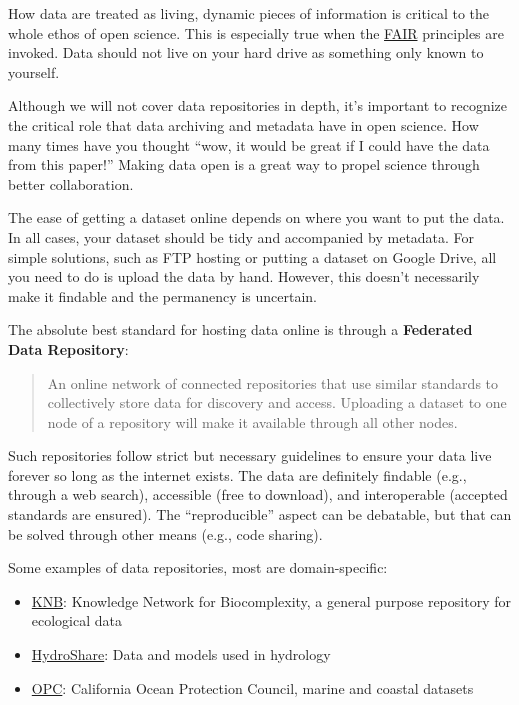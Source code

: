 \documentclass[
  letterpaper,
  DIV=11,
  numbers=noendperiod]{scrreprt}
\providecommand{\tightlist}{%
  \setlength{\itemsep}{0pt}\setlength{\parskip}{0pt}}\usepackage{longtable,booktabs,array}
\begin{document}
How data are treated as living, dynamic pieces of information is
critical to the whole ethos of open science. This is especially true
when the \protect\hyperlink{fair}{FAIR} principles are invoked. Data
should not live on your hard drive as something only known to yourself.

Although we will not cover data repositories in depth, it's important to
recognize the critical role that data archiving and metadata have in
open science. How many times have you thought ``wow, it would be great
if I could have the data from this paper!'' Making data open is a great
way to propel science through better collaboration.

The ease of getting a dataset online depends on where you want to put
the data. In all cases, your dataset should be tidy and accompanied by
metadata. For simple solutions, such as FTP hosting or putting a dataset
on Google Drive, all you need to do is upload the data by hand. However,
this doesn't necessarily make it findable and the permanency is
uncertain.

The absolute best standard for hosting data online is through a
\textbf{Federated Data Repository}:

\begin{quote}
An online network of connected repositories that use similar standards
to collectively store data for discovery and access. Uploading a dataset
to one node of a repository will make it available through all other
nodes.
\end{quote}

Such repositories follow strict but necessary guidelines to ensure your
data live forever so long as the internet exists. The data are
definitely findable (e.g., through a web search), accessible (free to
download), and interoperable (accepted standards are ensured). The
``reproducible'' aspect can be debatable, but that can be solved through
other means (e.g., code sharing).

Some examples of data repositories, most are domain-specific:

\begin{itemize}
\tightlist
\item
  \href{https://knb.ecoinformatics.org/}{KNB}: Knowledge Network for
  Biocomplexity, a general purpose repository for ecological data
\item
  \href{https://www.hydroshare.org/}{HydroShare}: Data and models used
  in hydrology
\item
  \href{https://opc.dataone.org/data}{OPC}: California Ocean Protection
  Council, marine and coastal datasets
\end{itemize}
\end{document}
